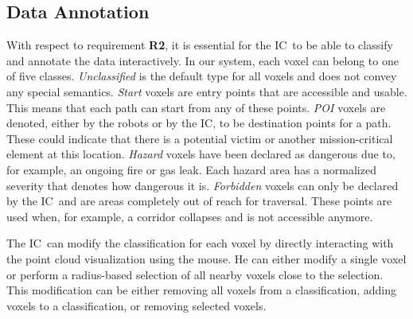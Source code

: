 \documentclass[review,journal]{vgtc}         %
\def\IC{IC}
\begin{document}
\subsection{Data Annotation} \label{sec:overview:annotation}
With respect to requirement {\bfseries R2}, it is essential for the \IC\ to be able to classify and annotate the data interactively. In our system, each voxel can belong to one of five classes. \emph{Unclassified} is the default type for all voxels and does not convey any special semantics. \emph{Start} voxels are entry points that are accessible and usable. This means that each path can start from any of these points. \emph{POI} voxels are denoted, either by the robots or by the \IC, to be destination points for a path. These could indicate that there is a potential victim or another mission-critical element at this location. \emph{Hazard} voxels have been declared as dangerous due to, for example, an ongoing fire or gas leak. Each hazard area has a normalized severity that denotes how dangerous it is. \emph{Forbidden} voxels can only be declared by the \IC\ and are areas completely out of reach for traversal. These points are used when, for example, a corridor collapses and is not accessible anymore.

The \IC\ can modify the classification for each voxel by directly interacting with the point cloud visualization using the mouse. He can either modify a single voxel or perform a radius-based selection of all nearby voxels close to the selection. This modification can be either removing all voxels from a classification, adding voxels to a classification, or removing selected voxels.
\end{document}
